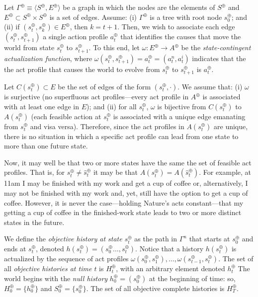\documentclass[
11pt,
titlepage,
reqno,
]{article}%
\theoremstyle{definition}
\begin{document}
Let $\Gamma^\oplus\equiv\langle S^\oplus,E^\oplus\rangle$ be a graph in which the nodes are the elements of $S^\oplus$ and $E^\oplus\subset S^\oplus\times S^\oplus$ is a set of edges.
Assume: (i) $\Gamma^\oplus$ is a tree with root node $s^\oplus_0$; and (ii) if $(s^\oplus_t,s^\oplus_k)\in E^\oplus$, then $k=t+1$.
Then, we wish to associate each edge $(s^\oplus_t,s^\oplus_{t+1})$ a single action profile  $a^\oplus_t$ that identifies the causes that move the world from state $s^\oplus_t$ to $s^\oplus_{t+1}$.
To this end, let $\omega :E^\oplus\rightarrow A^\oplus$ be the \textit{state-contingent actualization function}, where $\omega (s^\oplus_t,s^\oplus_{t+1})=a^\oplus_t=(a^n_t,a^i_t)$ indicates that the the act profile that causes the world to evolve from $s^\oplus_t$ to $s^\oplus_{t+1}$ is $a^\oplus_t$.

Let $C(s^\oplus_t)\subset E$ be the set of edges of the form $(s^\oplus_t,\cdot)$.
We assume that: (i) $\omega$ is surjective (no superfluous act profiles---every act profile in $A^\oplus$ is associated with at least one edge in $E$); and (ii)  for all $s^\oplus_t$, $\omega$ is bijective from $C(s^\oplus_t)$ to $A(s^\oplus_t)$ (each feasible action at $s^\oplus_t$ is associated with a unique edge emanating from $s^\oplus_t$ and visa versa).	
Therefore, since the act profiles in $A(s^\oplus_t)$ are unique, there is no situation in which a specific act profile can lead from one state to more than one future state. 

Now, it may well be that  two or more states have the same the set of feasible act profiles. That is, for $s^\oplus_t\ne \hat{s}^\oplus_t$ it may be that $A(s^\oplus_t)=A(\hat{s}^\oplus_t)$. For example, at 11am I may be finished with my work and get a cup of coffee or, alternatively, I may not be finished with my work and, yet, still have the option to get a cup of coffee. However, it is never the case---holding Nature's acts constant---that my getting a cup of coffee in the finished-work state leads to two or more distinct states in the future.


We define the \textit{objective history at state $s^\oplus_t$} as the path in $\Gamma^n$ that starts at $s^\oplus_0$ and ends at $s^\oplus_t$, denoted $h(s^\oplus_t)=(s^\oplus_0\ldots,s^\oplus_t)$.
Notice that a history $h(s^\oplus_t)$ is actualized by the sequence of act profiles $\omega(s^\oplus_0,s^\oplus_1),\ldots,\omega(s^\oplus_{t-1},s^\oplus_t)$.
The set of all \textit{objective histories at time $t$} is $H^\oplus_t$, with an arbitrary element  denoted $h^\oplus_t$
The world begins  with the \textit{null history} $h^\oplus_0=(s^\oplus_0)$ at the beginning of time: so, $H^\oplus_0=\{h^\oplus_0\}$ and  $S^\oplus_0=\{s^\oplus_0\}$.   
The set of all objective complete histories is $H^\oplus_T$.
\end{document}
